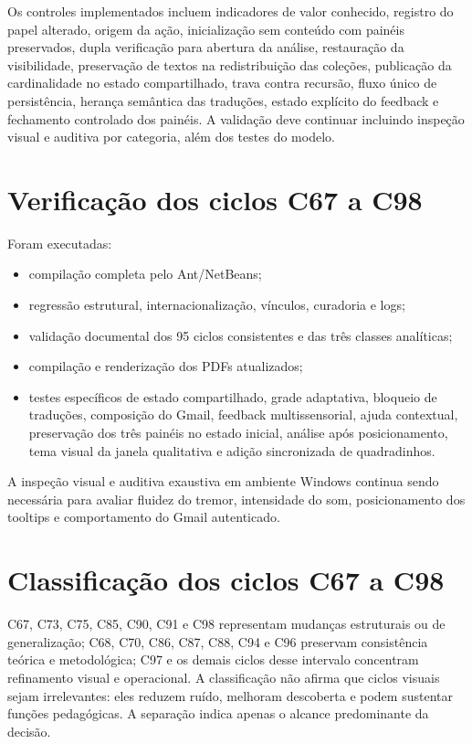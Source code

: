 \documentclass[12pt,a4paper]{article}
\begin{document}
Os controles implementados incluem indicadores de valor conhecido, registro do papel alterado, origem da ação, inicialização sem conteúdo com painéis preservados, dupla verificação para abertura da análise, restauração da visibilidade, preservação de textos na redistribuição das coleções, publicação da cardinalidade no estado compartilhado, trava contra recursão, fluxo único de persistência, herança semântica das traduções, estado explícito do feedback e fechamento controlado dos painéis. A validação deve continuar incluindo inspeção visual e auditiva por categoria, além dos testes do modelo.

\section{Verificação dos ciclos C67 a C98}

Foram executadas:
\begin{itemize}[noitemsep]
  \item compilação completa pelo Ant/NetBeans;
  \item regressão estrutural, internacionalização, vínculos, curadoria e logs;
  \item validação documental dos 95 ciclos consistentes e das três classes analíticas;
  \item compilação e renderização dos PDFs atualizados;
  \item testes específicos de estado compartilhado, grade adaptativa, bloqueio de traduções, composição do Gmail, feedback multissensorial, ajuda contextual, preservação dos três painéis no estado inicial, análise após posicionamento, tema visual da janela qualitativa e adição sincronizada de quadradinhos.
\end{itemize}

A inspeção visual e auditiva exaustiva em ambiente Windows continua sendo necessária para avaliar fluidez do tremor, intensidade do som, posicionamento dos tooltips e comportamento do Gmail autenticado.

\section{Classificação dos ciclos C67 a C98}

C67, C73, C75, C85, C90, C91 e C98 representam mudanças estruturais ou de generalização; C68, C70, C86, C87, C88, C94 e C96 preservam consistência teórica e metodológica; C97 e os demais ciclos desse intervalo concentram refinamento visual e operacional. A classificação não afirma que ciclos visuais sejam irrelevantes: eles reduzem ruído, melhoram descoberta e podem sustentar funções pedagógicas. A separação indica apenas o alcance predominante da decisão.
\end{document}
